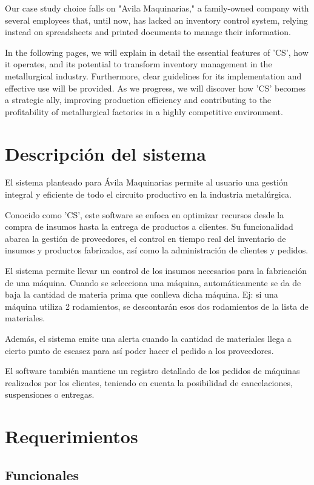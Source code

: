 \documentclass{article}
\begin{document}
	   Our case study choice falls on "Avila Maquinarias," a family-owned company with several employees that, until now, has lacked an inventory control system, relying instead on spreadsheets and printed documents to manage their information.

	   In the following pages, we will explain in detail the essential features of 'CS', how it operates, and its potential to transform inventory management in the metallurgical industry. Furthermore, clear guidelines for its implementation and effective use will be provided. As we progress, we will discover how 'CS' becomes a strategic ally, improving production efficiency and contributing to the profitability of metallurgical factories in a highly competitive environment.

\section{Descripción del sistema}

	   El sistema planteado para Ávila Maquinarias permite al usuario una gestión integral y eficiente de todo el circuito productivo en la industria metalúrgica.
	
	   Conocido como 'CS', este software se enfoca en optimizar recursos desde la compra de insumos hasta la entrega de productos a clientes. Su funcionalidad abarca la gestión de proveedores, el control en tiempo real del inventario de insumos y productos fabricados, así como la administración de clientes y pedidos. 

	   El sistema permite llevar un control de los insumos necesarios para la fabricación de una máquina. Cuando se selecciona una máquina, automáticamente se da de baja la cantidad de materia prima que conlleva dicha máquina. Ej: si una máquina utiliza 2 rodamientos, se descontarán esos dos rodamientos de la lista de materiales.

	   Además, el sistema emite una alerta cuando la cantidad de materiales llega a cierto punto de escasez para así poder hacer el pedido a los proveedores.
	
	   El software también mantiene un registro detallado de los pedidos de máquinas realizados por los clientes, teniendo en cuenta la posibilidad de cancelaciones, suspensiones o entregas.

\section{Requerimientos}
\subsection{Funcionales}
\end{document}
